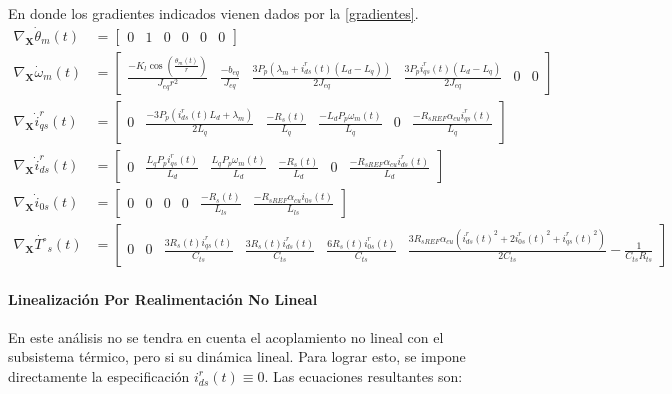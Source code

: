 \documentclass[a4paper, 10pt, onecolumn,journal]{ieeeconf}
\begin{document}
En donde los gradientes indicados vienen dados por la \cref{gradientes}.
\begin{equation}
    \begin{aligned}
        \nabla_{\mathbf{X}} \dot{\theta}_m(t) &= \begin{bmatrix} 0 & 1 & 0 & 0 & 0 & 0 \end{bmatrix}\\
        \nabla_{\mathbf{X}} \dot{\omega}_m(t) &= \begin{bmatrix}
        \frac{-K_{l} \cos\left(\frac{\theta_m(t)}{r}\right)}{J_{eq} r^2} & \frac{-b_{eq}}{J_{eq}} & \frac{3 P_p \left(\lambda_m+i^r_{ds}(t) \left(L_d-L_q\right)\right)}{2 J_{eq}} & \frac{3 P_p i^r_{qs}(t) \left(L_d-L_q\right)}{2 J_{eq}} & 0 & 0 
        \end{bmatrix}\\
        \nabla_{\mathbf{X}} \dot{i}^r_{qs}(t) &= \begin{bmatrix} 
        0 & \frac{-3 P_p \left(i^r_{ds}(t) L_d+\lambda_m\right)}{2 L_q} & \frac{-R_s(t)}{L_q} & \frac{-L_d P_p \omega_m(t)}{L_q} & 0 & \frac{-R_{sREF} \alpha_{cu} i^r_{qs}(t)}{L_q} 
        \end{bmatrix}\\
        \nabla_{\mathbf{X}} \dot{i}^r_{ds}(t) &= \begin{bmatrix} 
        0 & \frac{L_q P_p i^r_{qs}(t)}{L_d} & \frac{L_q P_p \omega_m(t)}{L_d} & \frac{-R_s(t)}{L_d} & 0 & \frac{-R_{sREF} \alpha_{cu} i^r_{ds}(t)}{L_d} 
        \end{bmatrix}\\
        \nabla_{\mathbf{X}} \dot{i}_{0s}(t) &= \begin{bmatrix} 
        0 & 0 & 0 & 0 & \frac{-R_s(t)}{L_{ls}} & \frac{-R_{sREF} \alpha_{cu} i_{0s}(t)}{L_{ls}} 
        \end{bmatrix}\\
        \nabla_{\mathbf{X}} \dot{T^\circ}_s(t) &= \begin{bmatrix} 
        0 & 0 & \frac{3 R_s(t) i^r_{qs}(t)}{C_{ts}} & \frac{3 R_s(t) i^r_{ds}(t)}{C_{ts}} & \frac{6 R_s(t) i^r_{0s}(t)}{C_{ts}} & \frac{3 R_{sREF} \alpha_{cu} \left({i^r_{ds}(t)}^2+2 {i^r_{0s}(t)}^2+{i^r_{qs}(t)}^2\right)}{2 C_{ts}} - \frac{1}{C_{ts} R_{ts}} 
        \end{bmatrix}
    \end{aligned}
    \label{gradientes}
\end{equation}

\paragraph{\textbf{Linealización Por Realimentación No Lineal}}
En este análisis no se tendra en cuenta el acoplamiento no lineal con el subsistema térmico, pero si su dinámica lineal. Para lograr esto, se impone directamente la especificación $i^{r}_{ds}(t)\equiv0$. Las ecuaciones resultantes son:
\end{document}

